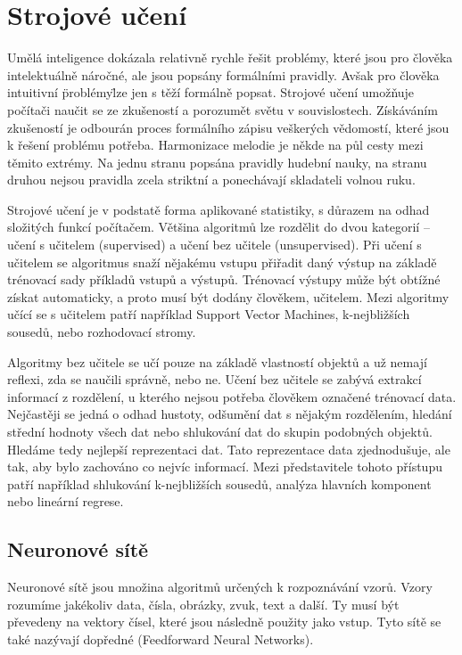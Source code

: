 \chapter{Strojové učení}
Umělá inteligence dokázala relativně rychle řešit problémy, 
které jsou pro člověka intelektuálně náročné, 
ale jsou popsány formálními pravidly.
Avšak pro člověka intuitivní \"problémy\" lze jen s těží formálně popsat.
Strojové učení umožňuje počítači naučit se ze zkušeností
a porozumět světu v souvislostech.
Získáváním zkušeností je odbourán proces formálního zápisu veškerých vědomostí,
které jsou k řešení problému potřeba.
\cite{Goodfellow-et-al-2016}
Harmonizace melodie je někde na půl cesty mezi těmito extrémy.
Na jednu stranu popsána pravidly hudební nauky,
na stranu druhou nejsou pravidla zcela striktní 
a ponechávají skladateli volnou ruku.
\par

Strojové učení je v podstatě forma aplikované statistiky,
s důrazem na odhad složitých funkcí počítačem.
Většina algoritmů lze rozdělit do dvou kategorií --
učení s učitelem (supervised) 
a učení bez učitele (unsupervised).
Při učení s učitelem se algoritmus snaží nějakému vstupu přiřadit daný výstup
na základě trénovací sady příkladů vstupů a výstupů.
Trénovací výstupy může být obtížné získat automaticky,
a proto musí být dodány člověkem, učitelem.
Mezi algoritmy učící se s učitelem patří například Support Vector Machines,
k-nejbližších sousedů, nebo rozhodovací stromy.
\cite{Goodfellow-et-al-2016}
\par

Algoritmy bez učitele se učí pouze na základě vlastností objektů 
a už nemají reflexi, zda se naučili správně, nebo ne.
Učení bez učitele se zabývá extrakcí informací z rozdělení,
u kterého nejsou potřeba člověkem označené trénovací data.
Nejčastěji se jedná o odhad hustoty, odšumění dat s nějakým rozdělením,
hledání střední hodnoty všech dat 
nebo shlukování dat do skupin podobných objektů.
Hledáme tedy nejlepší reprezentaci dat.
Tato reprezentace data zjednodušuje, ale tak, 
aby bylo zachováno co nejvíc informací.
Mezi představitele tohoto přístupu patří například 
shlukování k-nejbližších sousedů, 
analýza hlavních komponent nebo lineární regrese. 
\cite{Goodfellow-et-al-2016}

\section{Neuronové sítě}
Neuronové sítě jsou množina algoritmů určených k rozpoznávání vzorů.
Vzory rozumíme jakékoliv data, čísla, obrázky, zvuk, text a další.
Ty musí být převedeny na vektory čísel, 
které jsou následně použity jako vstup.
Tyto sítě se také nazývají dopředné (Feedforward Neural Networks).
\cite{Nicholson_NeuralNets}
\par

